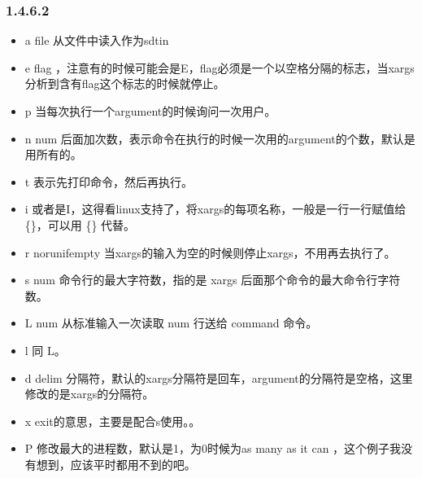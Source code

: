 \documentclass[letterpaper,12pt,english]{sphinxmanual}
\begin{document}
\subsubsection{1.4.6.2   }
\label{\detokenize{001software/001install/linux:id22}}\begin{itemize}
\item {} 
\sphinxhyphen{}a file 从文件中读入作为sdtin

\item {} 
\sphinxhyphen{}e flag
，注意有的时候可能会是\sphinxhyphen{}E，flag必须是一个以空格分隔的标志，当xargs分析到含有flag这个标志的时候就停止。

\item {} 
\sphinxhyphen{}p 当每次执行一个argument的时候询问一次用户。

\item {} 
\sphinxhyphen{}n num
后面加次数，表示命令在执行的时候一次用的argument的个数，默认是用所有的。

\item {} 
\sphinxhyphen{}t 表示先打印命令，然后再执行。

\item {} 
\sphinxhyphen{}i
或者是\sphinxhyphen{}I，这得看linux支持了，将xargs的每项名称，一般是一行一行赋值给
\{\}，可以用 \{\} 代替。

\item {} 
\sphinxhyphen{}r no\sphinxhyphen{}run\sphinxhyphen{}if\sphinxhyphen{}empty
当xargs的输入为空的时候则停止xargs，不用再去执行了。

\item {} 
\sphinxhyphen{}s num 命令行的最大字符数，指的是 xargs
后面那个命令的最大命令行字符数。

\item {} 
\sphinxhyphen{}L num 从标准输入一次读取 num 行送给 command 命令。

\item {} 
\sphinxhyphen{}l 同 \sphinxhyphen{}L。

\item {} 
\sphinxhyphen{}d delim
分隔符，默认的xargs分隔符是回车，argument的分隔符是空格，这里修改的是xargs的分隔符。

\item {} 
\sphinxhyphen{}x exit的意思，主要是配合\sphinxhyphen{}s使用。。

\item {} 
\sphinxhyphen{}P 修改最大的进程数，默认是1，为0时候为as many as
it can ，这个例子我没有想到，应该平时都用不到的吧。

\end{itemize}
\end{document}
